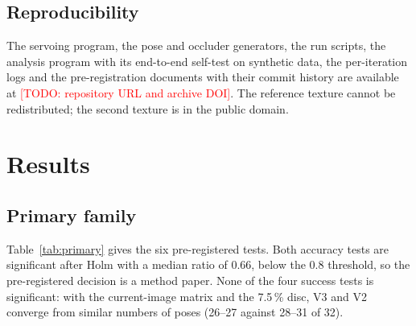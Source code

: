 \documentclass[preprint,12pt]{elsarticle}
\theoremstyle{remark}
\newcommand{\todo}[1]{\textcolor{red}{[TODO: #1]}}
\begin{document}
\subsection{Reproducibility}
The servoing program, the pose and occluder generators, the run scripts, the
analysis program with its end-to-end self-test on synthetic data, the
per-iteration logs and the pre-registration documents with their commit
history are available at \todo{repository URL and archive DOI}. The reference
texture cannot be redistributed; the second texture is in the public domain.

\section{Results}
\label{sec:results}

\subsection{Primary family}

Table~\ref{tab:primary} gives the six pre-registered tests. Both accuracy tests
are significant after Holm with a median ratio of 0.66, below the 0.8
threshold, so the pre-registered decision is a method paper. None of the four
success tests is significant: with the current-image matrix and the 7.5\,\%
disc, V3 and V2 converge from similar numbers of poses (26--27 against 28--31
of 32).

\begin{table}[t]
\centering
\caption{Pre-registered primary family (Holm over six tests). Ratios are
Hodges--Lehmann estimates of V3/V2 with exact 95\,\% CIs, over the poses where
both succeed.}
\label{tab:primary}
\small
{}
\end{table}
\end{document}
